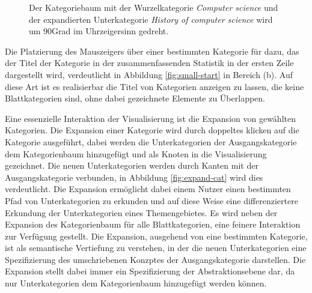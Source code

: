 \begin{figure}
    \caption{Der Kategoriebaum mit der Wurzelkategorie \emph{Computer science} und der expandierten Unterkategorie \emph{History of computer science} wird um 90\textdegree Grad im Uhrzeigersinn gedreht.}
    \label{fig:rotation-tree}
\end{figure}
Die Platzierung des Mauszeigers über einer bestimmten Kategorie für dazu, das der Titel der Kategorie in der zusammenfassenden Statistik in der ersten Zeile dargestellt wird, verdeutlicht in Abbildung \ref{fig:small-start} in Bereich (b).
Auf diese Art ist es realisierbar die Titel von Kategorien anzeigen zu lassen, die keine Blattkategorien sind, ohne dabei gezeichnete Elemente zu Überlappen.

Eine essenzielle Interaktion der Visualisierung ist die Expansion von gewählten Kategorien.
Die Expansion einer Kategorie wird durch doppeltes klicken auf die Kategorie ausgeführt, dabei werden die Unterkategorien der Ausgangskategorie dem Kategorienbaum hinzugefügt und als Knoten in die Visualisierung gezeichnet.
Die neuen Unterkategorien werden durch Kanten mit der Ausgangskategorie verbunden, in Abbildung \ref{fig:expand-cat} wird dies verdeutlicht.
Die Expansion ermöglicht dabei einem Nutzer einen bestimmten Pfad von Unterkategorien zu erkunden und auf diese Weise eine differenziertere Erkundung der Unterkategorien eines Themengebietes.
Es wird neben der Expansion des Kategorienbaum für alle Blattkategorien, eine feinere Interaktion zur Verfügung gestellt.
Die Expansion, ausgehend von eine bestimmten Kategorie, ist als semantische Vertiefung zu verstehen, in der die neuen Unterkategorien eine Spezifizierung des umschriebenen Konzptes der Ausgangskategorie darstellen.
Die Expansion stellt dabei immer ein Spezifizierung der Abstraktionsebene dar, da nur Unterkategorien dem Kategorienbaum hinzugefügt werden können.

